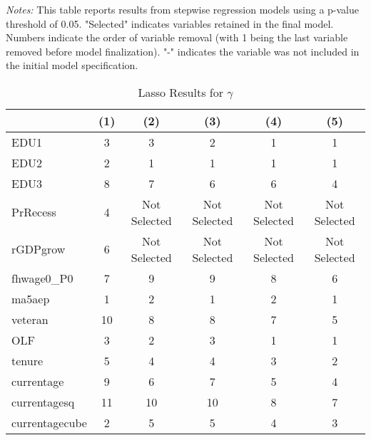 \documentclass[12pt]{article}
\begin{document}
\begin{table}[H]
\begin{tabular}{lccccc}
\bottomrule
\end{tabular}%
\newline

\footnotesize
\textit{Notes:} This table reports results from stepwise regression models using a p-value threshold of 0.05. "Selected" indicates variables retained in the final model. Numbers indicate the order of variable removal (with 1 being the last variable removed before model finalization). "-" indicates the variable was not included in the initial model specification.

\end{table}





\begin{table}[H]
\centering
\caption{Lasso Results for $\gamma$}

\begin{tabular}{lccccc}

\toprule
                    & (1)     & (2)   & (3)    & (4)      & (5)         \\

\midrule
EDU1                &  3  &  3    &  2  &  1   &  1    \\
EDU2                &  2  &  1    &  1  &  1   &  1    \\
EDU3                &  8  &  7    &  6  &  6   &  4    \\
PrRecess            &  4    & Not Selected    & Not Selected   & Not Selected    & Not Selected     \\
rGDPgrow            &  6    & Not Selected     & Not Selected   & Not Selected    & Not Selected     \\
fhwage0\_P0         &  7   &  9     &  9   &  8    &  6     \\
ma5aep              &  1   &  2     &  1   &  2    &  1     \\
veteran             &  10   &  8     &  8   &  7    &  5     \\
OLF                 &  3   &  2     &  3   &  1    &  1     \\
tenure              &  5   &  4     &  4   &  3    &  2     \\
currentage          &  9   &  6     &  7   &  5    &  4     \\
currentagesq        &  11  &  10    &  10  &  8   &  7    \\
currentagecube      &  2  &  5    &  5  &  4   &  3    \\


\end{tabular}
\end{table}
\end{document}
